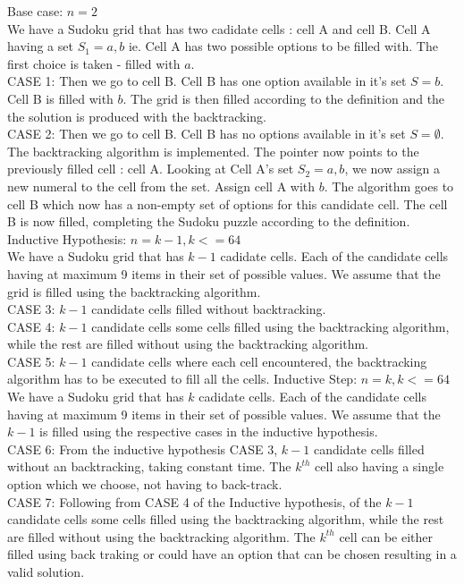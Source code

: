 \documentclass[12pt]{article}
\begin{document}
\begin{flushleft}
Base case: $n = 2$\\
We have a Sudoku grid that has two cadidate cells : cell A and cell B. Cell A having a set $S_1 = {a,b}$ ie. Cell A has two possible options to be filled with. The first choice is taken - filled with $a$. \\
CASE 1: Then we go to cell B. Cell B has one option available in it's set $S = {b}$. Cell B is filled with $b$. The grid is then filled according to the definition and the the solution is produced with the backtracking.  \\
CASE 2: Then we go to cell B. Cell B has no options available in it's set $S = {\emptyset}$. The backtracking algorithm is implemented. The pointer now points to the previously filled cell : cell A. Looking at Cell A's set $S_2 = {a,b}$, we now assign a new numeral to the cell from the set. Assign cell A with $b$. The algorithm goes to cell B which now has a non-empty set of options for this candidate cell. The cell B is now filled, completing the Sudoku puzzle according to the definition. 
\newline
Inductive Hypothesis: $n = k-1, k<=64$\\
We have a Sudoku grid that has $k-1$ cadidate cells. Each of the candidate cells having at maximum 9 items in their set of possible values. We assume that the grid is filled using the backtracking algorithm. \\
CASE 3: $k-1$ candidate cells filled without backtracking. \\
CASE 4: $k-1$ candidate cells some cells filled using the backtracking algorithm, while the rest are filled without using the backtracking algorithm. \\
CASE 5: $k-1$ candidate cells where each cell encountered, the backtracking algorithm has to be executed to fill all the cells. 
\newline
Inductive Step: $n = k, k<=64$\\
We have a Sudoku grid that has $k$ cadidate cells. Each of the candidate cells having at maximum 9 items in their set of possible values. We assume that the $k-1$ is filled using the respective cases in the inductive hypothesis. \\
CASE 6: From the inductive hypothesis CASE 3, $k-1$ candidate cells filled without an backtracking, taking constant time. The $k^{th}$ cell also having a single option which we choose, not having to back-track.  \\
CASE 7: Following from CASE 4 of the Inductive hypothesis, of the $k-1$ candidate cells some cells filled using the backtracking algorithm, while the rest are filled without using the backtracking algorithm. The $k^{th}$ cell can be either filled using back traking or could have an option that can be chosen resulting in a valid solution. \\

\end{flushleft}
\end{document}
